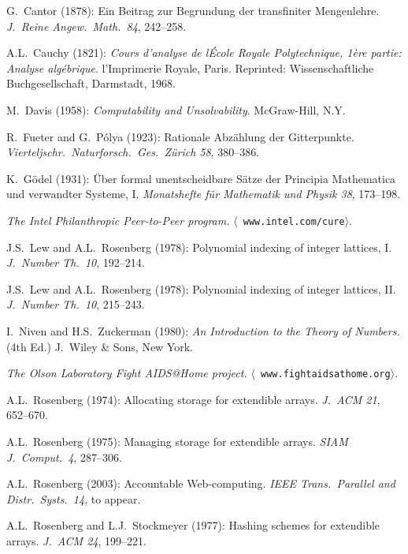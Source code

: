 
\begin{thebibliography}{99}

G.~Cantor (1878): Ein Beitrag zur Begrundung der transfiniter
Mengenlehre.  {\it J.~Reine Angew.~Math.~84}, 242--258.

A.L.~Cauchy (1821):
{\it Cours d'analyse de l\'{E}cole Royale Polytechnique, 1\`{e}re
partie: Analyse alg\'{e}brique}.
l'Imprimerie Royale, Paris.  Reprinted: Wissenschaftliche
Buchgesellschaft, Darmstadt, 1968.

M.~Davis (1958):
{\it Computability and Unsolvability}.
McGraw-Hill, N.Y.

R.~Fueter and G.~P\'{o}lya (1923):
Rationale Abz\"{a}hlung der Gitterpunkte.  {\it
Vierteljschr.~Naturforsch.~Ges.~Z\"{u}rich 58}, 380--386.

K.~G\"{o}del (1931): \"{U}ber formal unentscheidbare S\"{a}tze der
Principia Mathematica und verwandter Systeme, I.  {\it Monatshefte
f\"{u}r Mathematik und Physik 38}, 173--198.

{\it The Intel Philanthropic Peer-to-Peer program.}  $\langle${\tt
www.intel.com/cure}$\rangle$.

J.S.~Lew and A.L.~Rosenberg (1978): Polynomial indexing of integer
lattices, I.  {\it J.~Number Th.~10}, 192--214.
 
J.S.~Lew and A.L.~Rosenberg (1978): Polynomial indexing of integer
lattices, II.  {\it J.~Number Th.~10}, 215--243.

I.~Niven and H.S.~Zuckerman (1980):
{\it An Introduction to the Theory of Numbers.} (4th Ed.)
J.~Wiley \& Sons, New York.

{\it The Olson Laboratory Fight AIDS@Home project.}  $\langle${\tt
www.fightaidsathome.org}$\rangle$.
 
A.L.~Rosenberg (1974): Allocating storage for extendible arrays.  {\it
J.~ACM 21}, 652--670.

A.L.~Rosenberg (1975): Managing storage for extendible arrays.  {\it
SIAM J.~Comput.~4}, 287--306.

A.L.~Rosenberg (2003): Accountable Web-computing.  {\it IEEE
Trans.~Parallel and Distr.~Systs.~14}, to appear.

A.L.~Rosenberg and L.J.~Stockmeyer (1977): Hashing schemes for
extendible arrays.  {\it J.~ACM 24}, 199--221.


\end{thebibliography}
